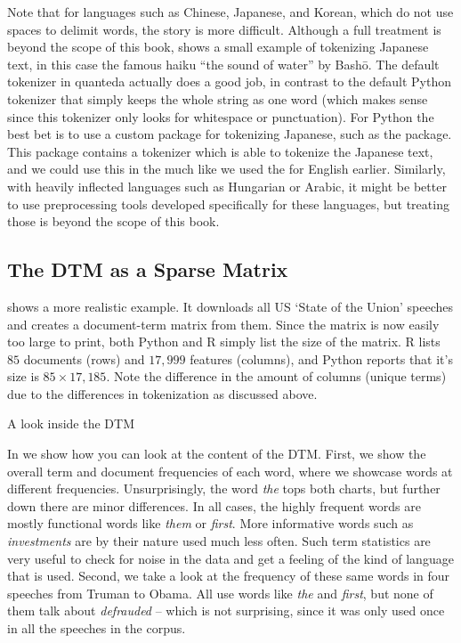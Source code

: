 Note that for languages such as Chinese, Japanese, and Korean, which do not use spaces to delimit words, the story is more difficult.
Although a full treatment is beyond the scope of this book,  shows a small example of tokenizing Japanese text,
in this case the famous haiku ``the sound of water'' by Bash\={o}.
The default tokenizer in quanteda actually does a good job, in contrast to the default Python tokenizer
that simply keeps the whole string as one word
(which makes sense since this tokenizer only looks for whitespace or punctuation).
For Python the best bet is to use a custom package for tokenizing Japanese, such as the  package.
This package contains a tokenizer which is able to tokenize the Japanese text, and we could use this in the 
much like we used the  for English earlier.
Similarly, with heavily inflected languages such as Hungarian or Arabic,
it might be better to use preprocessing tools developed specifically for these languages, but treating those is 
beyond the scope of this book. 


\subsection{The DTM as a Sparse Matrix}


 shows a more realistic example.
It downloads all US `State of the Union' speeches and creates a document-term matrix from them.
Since the matrix is now easily too large to print, both Python and R simply list the size of the matrix.
R lists $85$ documents (rows) and $17,999$ features (columns), and Python reports that it's size is $85\times17,185$.
Note the difference in the amount of columns (unique terms) due to the differences in tokenization as discussed above. 

\begin{ccsexample}
  \caption{A look inside the DTM}\label{ex:freq}
\end{ccsexample}


In  we show how you can look at the content of the DTM. First, we show the overall term and document frequencies of each word, where we showcase words at different frequencies. Unsurprisingly, the word \emph{the} tops both charts, but further down there are minor differences.
In all cases, the highly frequent words are mostly functional words like \emph{them} or \emph{first}. More informative words such as \emph{investments} are by their nature used much less often.
Such term statistics are very useful to check for noise in the data and get a feeling of the kind of language that is used. 
Second, we take a look at the frequency of these same words in four speeches from Truman to Obama. All use words like \emph{the} and \emph{first}, but none of them talk about \emph{defrauded} -- which is not surprising, since it was only used once in all the speeches in the corpus.

